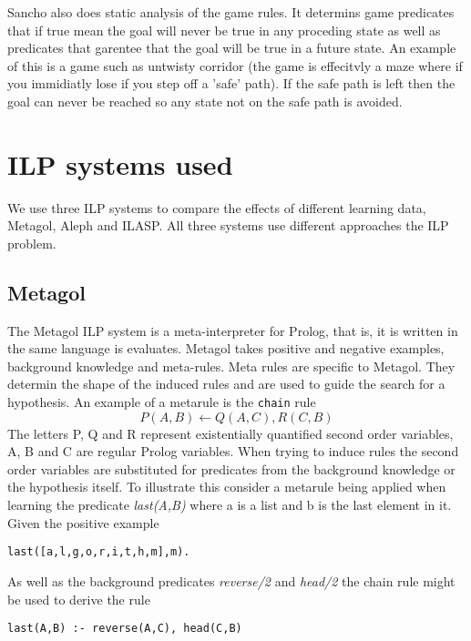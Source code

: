 Sancho also does static analysis of the game rules. It determins game predicates that if true mean the goal will never be true in any proceding state as well as predicates that garentee that the goal will be true in a future state. An example of this is a game such as untwisty corridor (the game is effecitvly a maze where if you immidiatly lose if you step off a 'safe' path). If the safe path is left then the goal can never be reached so any state not on the safe path is avoided.

\section{ILP systems used}
We use three ILP systems to compare the effects of different learning data, Metagol, Aleph and ILASP. All three systems use different approaches the ILP problem.
\subsection{Metagol}
The Metagol ILP system is a meta-interpreter for Prolog, that is, it is written in the same language is evaluates. Metagol takes positive and negative examples, background knowledge and meta-rules. Meta rules are specific to Metagol. They determin the shape of the induced rules and are used to guide the search for a hypothesis. An example of a metarule is the \texttt{chain} rule \[P(A,B) \leftarrow Q(A,C),R(C,B)\] The letters P, Q and R represent existentially quantified second order variables, A, B and C are regular Prolog variables. When trying to induce rules the second order variables are substituted for predicates from the background knowledge or the hypothesis itself. To illustrate this consider a metarule being applied when learning the predicate \textit{last(A,B)} where a is a list and b is the last element in it. Given the positive example 
\begin{verbatim}
last([a,l,g,o,r,i,t,h,m],m).
\end{verbatim}  

As well as the background predicates \textit{reverse/2} and \textit{head/2} the chain rule might be used to derive the rule 
\begin{verbatim}
last(A,B) :- reverse(A,C), head(C,B)
\end{verbatim}


